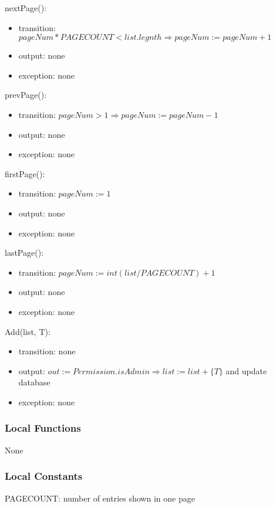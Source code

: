 \documentclass[12pt, titlepage]{article}
\begin{document}
\noindent nextPage():
\begin{itemize}
\item transition: $pageNum * PAGECOUNT < list.legnth \Rightarrow pageNum := pageNum + 1$
\item output: none
\item exception: none
\end{itemize}

\noindent prevPage():
\begin{itemize}
\item transition: $pageNum > 1 \Rightarrow pageNum := pageNum - 1$
\item output: none
\item exception: none
\end{itemize}

\noindent firstPage():
\begin{itemize}
\item transition: $pageNum := 1$
\item output: none
\item exception: none
\end{itemize}

\noindent lastPage():
\begin{itemize}
\item transition: $pageNum := int(list/PAGECOUNT) + 1$
\item output: none
\item exception: none
\end{itemize}

\noindent Add(list, T):
\begin{itemize}
\item transition: none
\item output: $out := Permission.isAdmin \Rightarrow list := list + \{T\}$ and update database
\item exception: none
\end{itemize}
\subsubsection{Local Functions}

None

\subsubsection{Local Constants}

PAGECOUNT: number of entries shown in one page

\newpage
\end{document}
